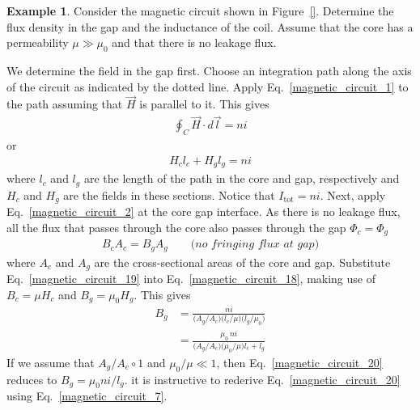 \documentclass[11pt,a4paper,oneside]{book}
\numberwithin{equation}{section}
\theoremstyle{it}
\theoremstyle{definition}
\newtheorem{example}{Example}[section]
\begin{document}
\begin{example}
	Consider the magnetic circuit shown in Figure~\ref{}. Determine the flux density in the gap and the inductance of the coil. Assume that the core has a permeability  $\mu\gg\mu_0$ and that there is no leakage flux.
	
	We determine the field in the gap first. Choose an integration path along the axis of the circuit as indicated by the dotted line. Apply Eq.~\eqref{magnetic_circuit_1} to the path assuming that $\vec{H}$ is parallel to it. This gives
	\begin{equation*}\label{}
		{\begin{aligned}
			\oint_{C}\vec{H}\cdot d\vec{l}=ni
		\end{aligned}}
	\end{equation*}
or
	\begin{equation}\label{magnetic_circuit_18}
	{\begin{aligned}
		H_cl_c+H_gl_g=ni
	\end{aligned}}
	\end{equation}
where $l_c$ and $l_g$ are the length of the path in the core and gap, respectively and $H_c$ and $H_g$ are the fields in these sections. Notice that $I_\text{tot} = ni$. Next, apply Eq.~\eqref{magnetic_circuit_2} at the core gap interface. As there is no leakage flux, all the flux that passes through the core also passes through the gap $\Phi_c=\Phi_g$
	\begin{equation}\label{magnetic_circuit_19}
	{\begin{aligned}
			B_cA_c=B_gA_g\qquad\textit{(no fringing flux at gap)}
	\end{aligned}}
	\end{equation}
where $A_c$ and $A_g$ are the cross-sectional areas of the core and gap. Substitute Eq.~\eqref{magnetic_circuit_19} into Eq.~\eqref{magnetic_circuit_18}, making use of $B_c=\mu H_c$ and $B_g=\mu_0 H_g$. This gives
	\begin{equation}\label{magnetic_circuit_20}
	{\begin{aligned}
			B_g &=\frac{ni}{\Big(A_g/A_c\Big)\Big(l_c/\mu\Big)\Big(l_g/\mu_0\Big)} \\[6pt]
			&=\frac{\mu_0\,ni}{\Big(A_g/A_c\Big)\Big(\mu_0/\mu\Big)l_c+l_g}
	\end{aligned}}
	\end{equation}
If we assume that $A_g/A_c\circ1$ and $\mu_0/\mu\ll1$, then Eq.~\eqref{magnetic_circuit_20} reduces to $B_g = \mu_0 ni/l_g$. it is instructive to rederive Eq.~\eqref{magnetic_circuit_20} using Eq.~\eqref{magnetic_circuit_7}.


\end{example}
\end{document}
